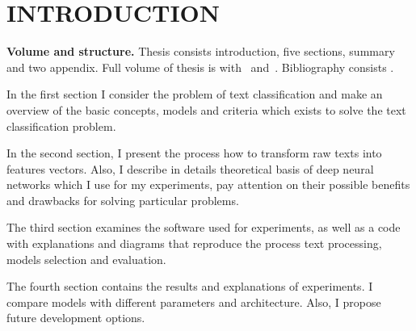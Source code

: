 \chapter*{INTRODUCTION}							%

\newcommand{\actuality}{}
\newcommand{\aim}{\textbf{Objective}}
\newcommand{\tasks}{Task}
\newcommand{\defpositions}{\textbf{Основные положения, выносимые на~защиту:}}
\newcommand{\novelty}{\textbf{Scientific novelty:}}
\newcommand{\influence}{\textbf{Scientific and practical significance}}
\newcommand{\reliability}{\textbf{Степень достоверности}}
\newcommand{\probation}{\textbf{Апробация работы.}}
\newcommand{\contribution}{\textbf{Personal contribution.}}
\newcommand{\publications}{\textbf{Publications.}}

%

\textbf{Volume and structure.} Thesis consists introduction, five sections, summary and two appendix.
Full volume of thesis is  
with~
and~.
Bibliography consists .

In the first section I consider the problem of text classification and make an overview of the basic concepts, models and criteria which exists to solve the text classification problem.

In the second section, I present the process how to transform raw texts into features vectors. Also, I describe in details theoretical basis of deep neural networks which I use for my experiments, pay attention on their possible benefits and drawbacks for solving particular problems.

The third section examines the software used for experiments, as well as a code with explanations and diagrams that reproduce the process text processing, models selection and evaluation. 

The fourth section contains the results and explanations of experiments. I compare models with different parameters and architecture. Also, I propose future development options.
